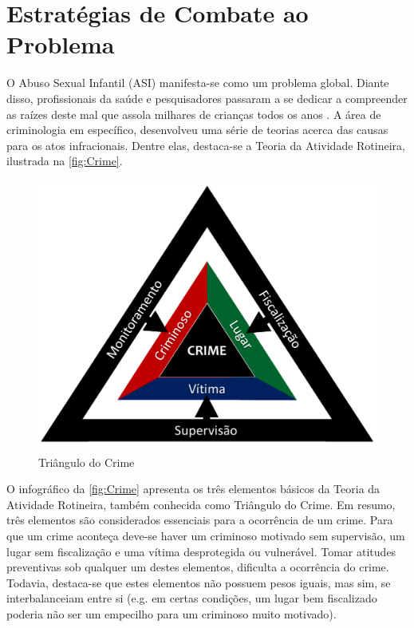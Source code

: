 \chapter{Estratégias de Combate ao Problema}\label{ch:Relacionados}


O Abuso Sexual Infantil (ASI) manifesta-se como um problema global. Diante disso, profissionais da saúde e pesquisadores passaram a se dedicar a compreender as raízes  deste mal que assola milhares de crianças todos os anos \cite{deslandes1994atenccao, dahlberg2006violencia, da2017violencia}. A área de criminologia em específico, desenvolveu uma série de teorias acerca das causas para os atos infracionais. Dentre elas, destaca-se a Teoria da Atividade Rotineira, ilustrada na \autoref{fig:Crime}.

\begin{figure}
  \caption{\label{fig:Crime}Triângulo do Crime}
      \begin{center}
        \includegraphics[width=\linewidth]{./Figuras/TrianguloCrime.pdf}
      \end{center}
\end{figure}

O infográfico da \autoref{fig:Crime} apresenta os três elementos básicos da Teoria da Atividade Rotineira, também conhecida como Triângulo do Crime. Em resumo, três elementos são considerados essenciais para a ocorrência de um crime. Para que um crime aconteça deve-se haver um criminoso motivado sem supervisão, um lugar sem fiscalização e uma vítima desprotegida ou vulnerável. Tomar atitudes preventivas sob qualquer um destes elementos, dificulta a ocorrência do crime. Todavia, destaca-se que estes elementos não possuem pesos iguais, mas sim, se interbalanceiam entre si (e.g. em certas condições, um lugar bem fiscalizado poderia não ser um empecilho para um criminoso muito motivado).



